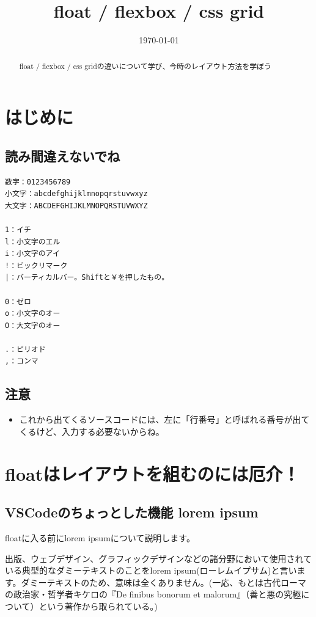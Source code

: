 \documentclass[mingoth,11pt,a4j,uplatex,dvipdfmx]{jsarticle}
\title{float / flexbox / css grid}
\date{\today}
\begin{document}

\maketitle

\begin{abstract}
float / flexbox / css gridの違いについて学び、今時のレイアウト方法を学ぼう
\end{abstract}

\tableofcontents
\newpage

\section{はじめに}
\subsection{読み間違えないでね}

\begin{lstlisting}[caption=読み間違えないでね]
数字：0123456789
小文字：abcdefghijklmnopqrstuvwxyz
大文字：ABCDEFGHIJKLMNOPQRSTUVWXYZ

1：イチ
l：小文字のエル
i：小文字のアイ
!：ビックリマーク
|：バーティカルバー。Shiftと￥を押したもの。

0：ゼロ
o：小文字のオー
O：大文字のオー

.：ピリオド
,：コンマ
\end{lstlisting}

\subsection{注意}
\begin{itemize}
\item これから出てくるソースコードには、左に「行番号」と呼ばれる番号が出てくるけど、入力する必要ないからね。
\end{itemize}

\section{floatはレイアウトを組むのには厄介！}
\subsection{VSCodeのちょっとした機能 lorem ipsum}
floatに入る前にlorem ipsumについて説明します。

出版、ウェブデザイン、グラフィックデザインなどの諸分野において使用されている典型的なダミーテキストのことをlorem ipsum(ローレムイプサム)と言います。ダミーテキストのため、意味は全くありません。(一応、もとは古代ローマの政治家・哲学者キケロの『De finibus bonorum et malorum』（善と悪の究極について）という著作から取られている。)
\end{document}

